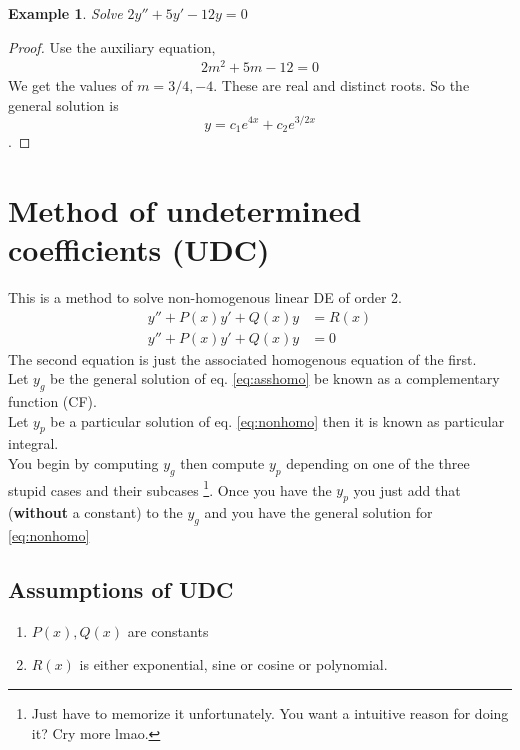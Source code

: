 \documentclass[oneside,11pt,pdftex,final]{book}%
\numberwithin{equation}{section}
\newtheorem{example}[theorem]{Example}
\numberwithin{section}{chapter}
\numberwithin{equation}{chapter}
\begin{document}
\begin{example}
	Solve $ 2y''+5y'-12y=0 $
\end{example}
\begin{proof}
	Use the auxiliary equation,
	\begin{align*}
		2m^2+5m-12=0
	\end{align*}
We get the values of $ m=3/4, -4 $. These are real and distinct roots. So the general solution is \[ y=c_1 e^{4x}+c_2e^{3/2x} \].
\end{proof}

\section{Method of undetermined coefficients (UDC)}
This is a method to solve non-homogenous linear DE of order 2.
\begin{align}
	y''+P(x)y'+Q(x)y&=R(x)\label{eq:nonhomo}\\
		y''+P(x)y'+Q(x)y&=0 \label{eq:asshomo}
\end{align}
The second equation is just the associated homogenous equation of the first.\\
Let $ y_g $ be the general solution of eq. \ref{eq:asshomo} be known as a complementary function (CF).\\
Let $ y_p $ be a particular solution of eq. \ref{eq:nonhomo} then it is known as particular integral.
\\
You begin by computing $ y_g $ then compute $ y_p $ depending on one of the three stupid cases and their subcases \footnote{Just have to memorize it unfortunately. You want a intuitive reason for doing it? Cry more lmao.}. Once you have the $ y_p $ you just add that (\textbf{without} a constant) to the $ y_g $ and you have the general solution for \ref{eq:nonhomo}
\subsection{Assumptions of UDC}
\begin{enumerate}
	\item $ P(x),Q(x) $ are constants
	\item $ R(x) $ is either exponential, sine or cosine or polynomial.
\end{enumerate}
\end{document}
